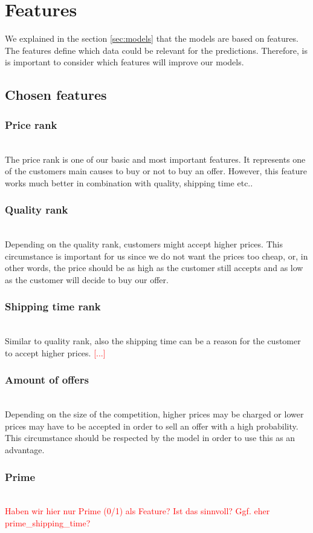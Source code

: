 \section{Features}
	We explained in the section \ref{sec:models} that the models are based on features. The features define which data could be relevant for the predictions. Therefore, is is important to consider which features will improve our models.
\subsection{Chosen features}
\subsubsection{Price rank}
\label{sec:pricerank}
	~\\
	The price rank is one of our basic and most important features. It represents one of the customers main causes to buy or not to buy an offer. However, this feature works much better in combination with quality, shipping time etc..
\subsubsection{Quality rank}
	~\\
	Depending on the quality rank, customers might accept higher prices. This circumstance is important for us since we do not want the prices too cheap, or, in other words, the price should be as high as the customer still accepts and as low as the customer will decide to buy our offer.
\subsubsection{Shipping time rank}
	~\\
	Similar to quality rank, also the shipping time can be a reason for the customer to accept higher prices. \textcolor{red}{[...]}
\subsubsection{Amount of offers}
	~\\
	Depending on the size of the competition, higher prices may be charged or lower prices may have to be accepted in order to sell an offer with a high probability. This circumstance should be respected by the model in order to use this as an advantage.
\subsubsection{Prime}
	~\\
	\textcolor{red}{Haben wir hier nur Prime (0/1) als Feature? Ist das sinnvoll? Ggf. eher prime\_shipping\_time?}

